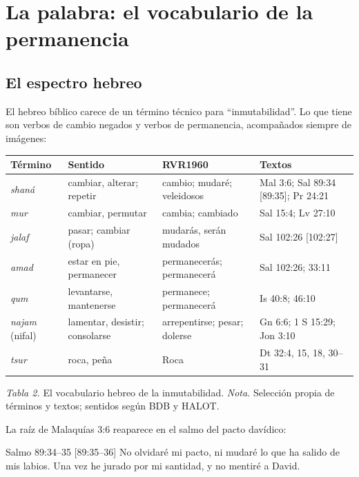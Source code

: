 \section{La palabra: el vocabulario de la permanencia}

\subsection{El espectro hebreo}
El hebreo bíblico carece de un término técnico para ``inmutabilidad''. Lo que tiene son verbos de cambio negados y verbos de permanencia, acompañados siempre de imágenes:

\begin{center}\small\renewcommand{\arraystretch}{1.18}
\begin{tabular}{@{}L{3.0cm}L{3.6cm}L{3.0cm}L{4.0cm}@{}}
\toprule
\textbf{Término} & \textbf{Sentido} & \textbf{RVR1960} & \textbf{Textos} \\ \midrule
{} \emph{shaná} & cambiar, alterar; repetir & cambio; mudaré; veleidosos & Mal 3:6; Sal 89:34 [89:35]; Pr 24:21 \\
 \emph{mur} & cambiar, permutar & cambia; cambiado & Sal 15:4; Lv 27:10 \\
 \emph{jalaf} & pasar; cambiar (ropa) & mudarás, serán mudados & Sal 102:26 [102:27] \\
 \emph{amad} & estar en pie, permanecer & permanecerás; permanecerá & Sal 102:26; 33:11 \\
 \emph{qum} & levantarse, mantenerse & permanece; permanecerá & Is 40:8; 46:10 \\
 \emph{najam} (nifal) & lamentar, desistir; consolarse & arrepentirse; pesar; dolerse & Gn 6:6; 1 S 15:29; Jon 3:10 \\
 \emph{tsur} & roca, peña & Roca & Dt 32:4, 15, 18, 30--31 \\
\bottomrule
\end{tabular}\par
{\footnotesize\color{gris}\textit{Tabla 2.} El vocabulario hebreo de la inmutabilidad. \textit{Nota.} Selección propia de términos y textos; sentidos según BDB y HALOT.}
\end{center}

La raíz de Malaquías 3:6 reaparece en el salmo del pacto davídico:

\begin{verso}{Salmo 89:34–35 [89:35–36]}
No olvidaré mi pacto, ni mudaré lo que ha salido de mis labios. Una vez he jurado por mi santidad, y no mentiré a David.
\end{verso}

